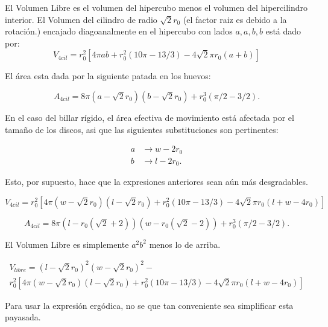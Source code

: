 \documentclass{article}
\begin{document}

El Volumen Libre es el volumen del hipercubo menos el volumen del
hipercilindro interior. El Volumen del cilindro de radio $\sqrt{2}r_0$
(el factor raiz es debido a la rotación.) 
encajado diagoanalmente en el hipercubo con lados $a, a, b, b$ está dado
por:
\begin{equation}
V_{4cil}=r_0^2 [4 \pi a b + r_0^2 (10\pi -13/3) -4 \sqrt{2} \pi r_0 (a+b) ]
\end{equation}


El área esta dada por la siguiente patada en los huevos:

\begin{equation}
A_{4cil}=8\pi (a-\sqrt{2}r_0)(b-\sqrt{2}r_0)+r_0^3(\pi/2-3/2).
\end{equation}

En el caso del billar rígido, el área efectiva de movimiento
está afectada por el tamaño de los discos, asi que las siguientes
substituciones son pertinentes:

\begin{align}
a &\rightarrow w-2r_0 \\
b &\rightarrow l-2r_0.
\end{align}

Esto, por supuesto, hace que la expresiones anteriores sean aún más desgradables.

\begin{equation}
V_{4cil}=r_0^2 [4 \pi (w-\sqrt{2}r_0)(l-\sqrt{2}r_0) + r_0^2 (10\pi -13/3) -
4 \sqrt{2} \pi r_0 (l+w-4r_0) ]
\end{equation}

\begin{equation}
A_{4cil}=8\pi (l-r_0(\sqrt{2}+2))(w-r_0(\sqrt{2}-2))+r_0^3(\pi/2-3/2).
\end{equation}

El Volumen Libre es simplemente $a^2b^2$ menos lo de arriba. 

\begin{multline}
V_{libre}=(l-\sqrt{2}r_0)^2(w-\sqrt{2}r_0)^2- \\
r_0^2 [4 \pi (w-\sqrt{2}r_0)(l-\sqrt{2}r_0) + r_0^2 (10\pi -13/3) -
4 \sqrt{2} \pi r_0 (l+w-4r_0) ]
\end{multline}

Para usar la expresión ergódica, no se que tan conveniente sea simplificar esta
payasada.
\end{document}
